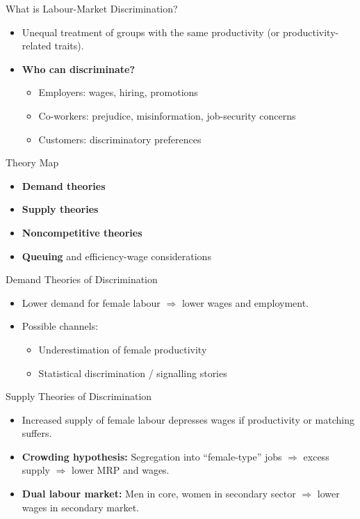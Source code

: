 \documentclass[aspectratio=169]{beamer}
\begin{document}
\begin{frame}{What is Labour-Market Discrimination?}
\transfade
\begin{itemize}[<+->]
  \item Unequal treatment of groups with the same productivity (or productivity-related traits).
  \item \textbf{Who can discriminate?}
    \begin{itemize}[<+->]
      \item \alert{Employers}: wages, hiring, promotions
      \item \alert{Co-workers}: prejudice, misinformation, job-security concerns
      \item \alert{Customers}: discriminatory preferences
    \end{itemize}
\end{itemize}
\end{frame}

\begin{frame}{Theory Map}
\transfade
\begin{itemize}[<+->]
  \item \textbf{Demand theories}
  \item \textbf{Supply theories}
  \item \textbf{Noncompetitive theories}
  \item \textbf{Queuing} and efficiency-wage considerations
\end{itemize}
\end{frame}

\begin{frame}{Demand Theories of Discrimination}
\transfade
\begin{itemize}[<+->]
  \item Lower \alert{demand} for female labour \(\Rightarrow\) lower wages and employment.
  \item Possible channels:
    \begin{itemize}[<+->]
      \item Underestimation of female productivity
      \item Statistical discrimination / signalling stories
    \end{itemize}
\end{itemize}
\end{frame}

\begin{frame}{Supply Theories of Discrimination}
\transfade
\begin{itemize}[<+->]
  \item Increased \alert{supply} of female labour depresses wages if productivity or matching suffers.
  \item \textbf{Crowding hypothesis:} Segregation into “female-type” jobs \(\Rightarrow\) excess supply \(\Rightarrow\) lower MRP and wages.
  \item \textbf{Dual labour market:} Men in core, women in secondary sector \(\Rightarrow\) lower wages in secondary market.
\end{itemize}
\end{frame}
\end{document}
